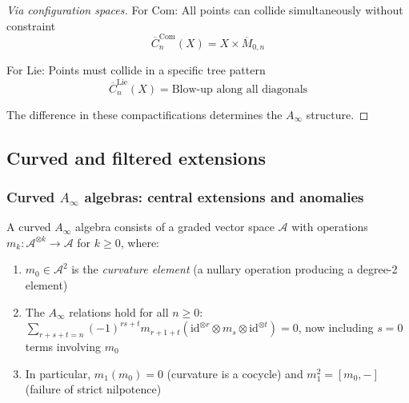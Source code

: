 \begin{proof}[Via configuration spaces]
For Com: All points can collide simultaneously without constraint
\[\overline{C}_n^{\text{Com}}(X) = X \times \overline{M}_{0,n}\]

For Lie: Points must collide in a specific tree pattern
\[\overline{C}_n^{\text{Lie}}(X) = \text{Blow-up along all diagonals}\]

The difference in these compactifications determines the $A_\infty$ structure.
\end{proof}


\subsection{Curved and filtered extensions}

\subsubsection{\texorpdfstring{Curved $A_\infty$ algebras: central extensions and anomalies}{Curved A-infinity algebras: central extensions and anomalies}}

\begin{definition}\label{def:curved-ainfty-hg}
A curved $A_\infty$ algebra consists of a graded vector space $\mathcal{A}$ with operations $m_k: \mathcal{A}^{\otimes k} \to \mathcal{A}$ for $k \geq 0$, where:
\begin{enumerate}
\item $m_0 \in \mathcal{A}^2$ is the \emph{curvature element} (a nullary operation producing a degree-2 element)
\item The $A_\infty$ relations hold for all $n \geq 0$: $\sum_{r+s+t=n} (-1)^{rs+t} m_{r+1+t}(\text{id}^{\otimes r} \otimes m_s \otimes \text{id}^{\otimes t}) = 0$, now including $s = 0$ terms involving $m_0$
\item In particular, $m_1(m_0) = 0$ (curvature is a cocycle) and $m_1^2 = [m_0, -]$ (failure of strict nilpotence)
\end{enumerate}
\end{definition}

